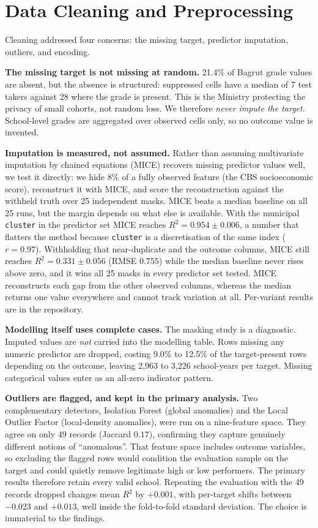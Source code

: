 \section{Data Cleaning and Preprocessing}

Cleaning addressed four concerns: the missing target, predictor imputation,
outliers, and encoding.

\textbf{The missing target is not missing at random.} 21.4\% of Bagrut grade
values are absent, but the absence is structured: suppressed cells have a median
of 7 test takers against 28 where the grade is present. This is the Ministry
protecting the privacy of small cohorts, not random loss. We therefore
\emph{never impute the target}. School-level grades are aggregated over observed
cells only, so no outcome value is invented.

\textbf{Imputation is measured, not assumed.} Rather than assuming multivariate
imputation by chained equations (MICE) recovers missing predictor values well, we
test it directly: we hide 8\% of a fully observed feature (the CBS socioeconomic
score), reconstruct it with MICE, and score the reconstruction against the
withheld truth over 25 independent masks. MICE beats a median baseline on all 25 runs, but the
margin depends on what else is available. With the municipal \texttt{cluster} in
the predictor set MICE reaches $R^2 = 0.954 \pm 0.006$, a number that flatters
the method because \texttt{cluster} is a discretisation of the same index
($r = 0.97$). Withholding that near-duplicate and the outcome columns, MICE still
reaches $R^2 = 0.331 \pm 0.056$ (RMSE $0.755$) while the median baseline never
rises above zero, and it wins all 25 masks in every predictor set tested. MICE
reconstructs each gap from the other observed columns, whereas the median returns
one value everywhere and cannot track variation at all. Per-variant results are
in the repository.

\textbf{Modelling itself uses complete cases.} The masking study is a diagnostic.
Imputed values are \emph{not} carried into the modelling table. Rows missing any
numeric predictor are dropped, costing 9.0\% to 12.5\% of the target-present rows
depending on the outcome, leaving 2,963 to 3,226 school-years per target. Missing
categorical values enter as an all-zero indicator pattern.

\textbf{Outliers are flagged, and kept in the primary analysis.} Two
complementary detectors, Isolation Forest (global anomalies) and the Local
Outlier Factor (local-density anomalies), were run on a nine-feature space. They
agree on only 49 records (Jaccard $0.17$), confirming they capture genuinely
different notions of ``anomalous''. That feature space includes outcome
variables, so excluding the flagged rows would condition the evaluation sample on
the target and could quietly remove legitimate high or low performers. The
primary results therefore retain every valid school. Repeating the evaluation
with the 49 records dropped changes mean $R^2$ by $+0.001$, with per-target
shifts between $-0.023$ and $+0.013$, well inside the fold-to-fold standard
deviation. The choice is immaterial to the findings.

